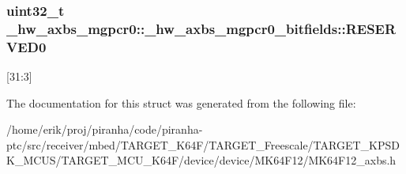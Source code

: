 \subsubsection[{\texorpdfstring{R\+E\+S\+E\+R\+V\+E\+D0}{RESERVED0}}]{\setlength{\rightskip}{0pt plus 5cm}uint32\+\_\+t \+\_\+hw\+\_\+axbs\+\_\+mgpcr0\+::\+\_\+hw\+\_\+axbs\+\_\+mgpcr0\+\_\+bitfields\+::\+R\+E\+S\+E\+R\+V\+E\+D0}\hypertarget{struct__hw__axbs__mgpcr0_1_1__hw__axbs__mgpcr0__bitfields_a9567e132815561ca4582c13a47723595}{}\label{struct__hw__axbs__mgpcr0_1_1__hw__axbs__mgpcr0__bitfields_a9567e132815561ca4582c13a47723595}
\mbox{[}31\+:3\mbox{]} 

The documentation for this struct was generated from the following file\+:\begin{DoxyCompactItemize}
\item 
/home/erik/proj/piranha/code/piranha-\/ptc/src/receiver/mbed/\+T\+A\+R\+G\+E\+T\+\_\+\+K64\+F/\+T\+A\+R\+G\+E\+T\+\_\+\+Freescale/\+T\+A\+R\+G\+E\+T\+\_\+\+K\+P\+S\+D\+K\+\_\+\+M\+C\+U\+S/\+T\+A\+R\+G\+E\+T\+\_\+\+M\+C\+U\+\_\+\+K64\+F/device/device/\+M\+K64\+F12/M\+K64\+F12\+\_\+axbs.\+h\end{DoxyCompactItemize}
